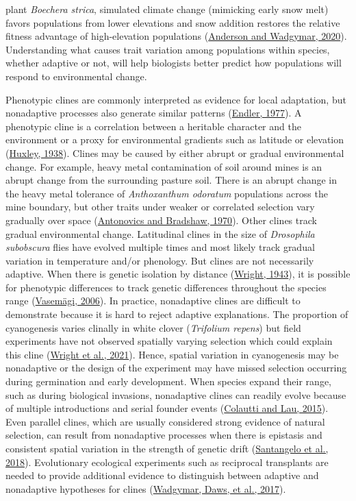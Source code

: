 \documentclass[
  12pt,
]{article}
\begin{document}
plant \emph{Boechera strica}, simulated climate change (mimicking early snow melt) favors populations from lower elevations and snow addition restores the relative fitness advantage of high-elevation populations (\protect\hyperlink{ref-anderson_climate_2020}{Anderson and Wadgymar, 2020}). Understanding what causes trait variation among populations within species, whether adaptive or not, will help biologists better predict how populations will respond to environmental change.

Phenotypic clines are commonly interpreted as evidence for local adaptation, but nonadaptive processes also generate similar patterns (\protect\hyperlink{ref-endler_geographic_1977}{Endler, 1977}). A phenotypic cline is a correlation between a heritable character and the environment or a proxy for environmental gradients such as latitude or elevation (\protect\hyperlink{ref-huxley_clines_1938}{Huxley, 1938}). Clines may be caused by either abrupt or gradual environmental change. For example, heavy metal contamination of soil around mines is an abrupt change from the surrounding pasture soil. There is an abrupt change in the heavy metal tolerance of \emph{Anthoxanthum odoratum} populations across the mine boundary, but other traits under weaker or correlated selection vary gradually over space (\protect\hyperlink{ref-antonovics_evolution_1970}{Antonovics and Bradshaw, 1970}). Other clines track gradual environmental change. Latitudinal clines in the size of \emph{Drosophila subobscura} flies have evolved multiple times and most likely track gradual variation in temperature and/or phenology. But clines are not necessarily adaptive. When there is genetic isolation by distance (\protect\hyperlink{ref-wright_isolation_1943}{Wright, 1943}), it is possible for phenotypic differences to track genetic differences throughout the species range (\protect\hyperlink{ref-vasemagi_adaptive_2006}{Vasemägi, 2006}). In practice, nonadaptive clines are difficult to demonstrate because it is hard to reject adaptive explanations. The proportion of cyanogenesis varies clinally in white clover (\emph{Trifolium repens}) but field experiments have not observed spatially varying selection which could explain this cline (\protect\hyperlink{ref-wright_genetic_2021}{Wright et al., 2021}). Hence, spatial variation in cyanogenesis may be nonadaptive or the design of the experiment may have missed selection occurring during germination and early development. When species expand their range, such as during biological invasions, nonadaptive clines can readily evolve because of multiple introductions and serial founder events (\protect\hyperlink{ref-colautti_contemporary_2015}{Colautti and Lau, 2015}). Even parallel clines, which are usually considered strong evidence of natural selection, can result from nonadaptive processes when there is epistasis and consistent spatial variation in the strength of genetic drift (\protect\hyperlink{ref-santangelo_modern_2018}{Santangelo et al., 2018}). Evolutionary ecological experiments such as reciprocal transplants are needed to provide additional evidence to distinguish between adaptive and nonadaptive hypotheses for clines (\protect\hyperlink{ref-wadgymar_integrating_2017}{Wadgymar, Daws, et al., 2017}).
\end{document}
